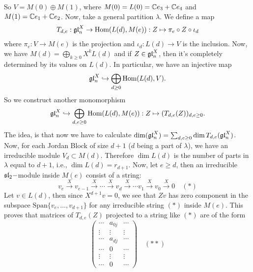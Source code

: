 So $V=M(0)\oplus M(1)$, where $M(0)=L(0)=\mathbb{C} e_3 + \mathbb{C} e_4$ and $M(1)=\mathbb{C} e_1 + \mathbb{C} e_2$. Now, take a general partition 
$\lambda$. We define a map 
\begin{equation}
   T_{d,e} : \mathfrak{gl}_n^X \rightarrow \text{Hom}(L(d), M(e)): Z\mapsto \pi_e\circ Z\circ \iota_d 
\end{equation}
where $\pi_e:V\to M(e)$ is the projection and $\iota_d:L(d)\to V$ is the inclusion. Now, we have 
$M(d)=\bigoplus_{k\geq0}X^kL(d)$ and if $Z\in\mathfrak{gl}_n^X$, then it's completely determined by its values on $L(d)$. 
In particular, we have an injective map 
\begin{equation}
    \mathfrak{gl}_n^X \hookrightarrow \bigoplus_{d\geq0}\text{Hom}(L(d), V).
\end{equation}
So we construct another monomorphism
\begin{equation}
    \mathfrak{gl}_n^X \hookrightarrow \bigoplus_{d,e\geq0}\text{Hom}(L(d), M(e)): Z\mapsto (T_{d,e}(Z))_{d,e\geq0}.
\end{equation}
The idea, is that now we have to calculate $\dim(\mathfrak{gl}_n^X)=\sum_{d,e\geq0}\dim T_{d,e}(\mathfrak{gl}_n^X)$. Now, for each 
Jordan Block of size $d+1$ ($d$ being a part of $\lambda$), we have an irreducible module $V_d\subset M(d)$. Therefore 
$\dim L(d)$ is the number of parts in $\lambda$ equal to $d+1$, i.e., $\dim L(d)=r_{d+1}$. Now, let 
$e\geq d$, then an irreducible $\mathfrak{sl}_2-$module inside $M(e)$ consist of a string: 
\begin{equation}
    v_e \overset{X}{\to} v_{e-1}\overset{X}{\to}\cdots\overset{X}{\to} v_d\overset{X}{\to} \cdots v_1\overset{X}{\to} v_0\overset{X}{\to} 0 \quad(*)
\end{equation}
Let $v\in L(d)$, then since $X^{d+1} v =0$, we see that $Zv$ has zero component in the subspace 
$\text{Span}\{v_e,\dots, v_{d+1}\}$ for any irreducible string $(*)$ inside $M(e)$. This proves that 
matrices of $T_{d,e}(Z)$ projected to a string like $(*)$ are of the form 
\begin{equation}
    \begin{pmatrix}
        \cdots&a_{0j}&\cdots\\
         \vdots&\vdots&\vdots\\
         \cdots&a_{dj}&\cdots\\
         \cdots&0&\cdots\\
         \vdots&\vdots&\vdots\\
          \cdots&0&\cdots
    \end{pmatrix}\quad(**)
\end{equation}
